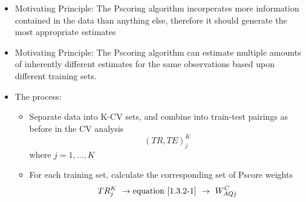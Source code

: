 \documentclass[12pt,]{article}
\providecommand{\tightlist}{%
  \setlength{\itemsep}{0pt}\setlength{\parskip}{0pt}}
\begin{document}
\begin{itemize}
\tightlist
\item
  Motivating Principle: The Pscoring algorithm incorperates more
  information contained in the data than anything else, therefore it
  should generate the most appropriate estimates
\item
  Motivating Principle: The Pscoring algorithm can estimate multiple
  amounts of inherently different estimates for the same observations
  based upon different training sets.
\item
  The process:

  \begin{itemize}
  \tightlist
  \item
    Separate data into K-CV sets, and combine into train-test pairings
    as before in the CV analysis \[(TR, TE)_{j}^{K}\] where
    \(j =1, \ldots, K\)
  \item
    For each training set, calculate the corresponding set of Pscore
    weights
    \[TR_{j}^{K} \ \rightarrow \text{equation} \ \eqref{1.3.2-1} \ \rightarrow \  W_{AQj}^{C}\]


\end{itemize}
\end{itemize}
\end{document}
